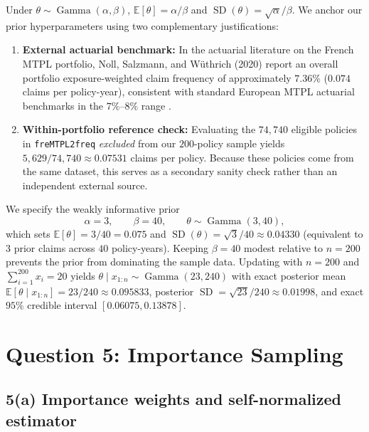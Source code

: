 \documentclass[11pt,a4paper]{article}
\begin{document}
Under $\theta \sim \operatorname{Gamma}(\alpha, \beta)$, $\mathbb{E}[\theta] = \alpha / \beta$ and $\operatorname{SD}(\theta) = \sqrt{\alpha} / \beta$. We anchor our prior hyperparameters using two complementary justifications:
\begin{enumerate}
    \item \textbf{External actuarial benchmark:} In the actuarial literature on the French MTPL portfolio, Noll, Salzmann, and W\"uthrich (2020) \cite{Noll2020} report an overall portfolio exposure-weighted claim frequency of approximately $7.36\%$ ($0.074$ claims per policy-year), consistent with standard European MTPL actuarial benchmarks in the $7\%$--$8\%$ range \cite{Charpentier2014}.
    \item \textbf{Within-portfolio reference check:} Evaluating the $74{,}740$ eligible policies in \texttt{freMTPL2freq} \emph{excluded} from our $200$-policy sample yields $5{,}629 / 74{,}740 \approx 0.07531$ claims per policy. Because these policies come from the same dataset, this serves as a secondary sanity check rather than an independent external source.
\end{enumerate}

We specify the weakly informative prior
\[
\boxed{\alpha = 3, \qquad \beta = 40, \qquad \theta \sim \operatorname{Gamma}(3, 40),}
\]
which sets $\mathbb{E}[\theta] = 3/40 = 0.075$ and $\operatorname{SD}(\theta) = \sqrt{3}/40 \approx 0.04330$ (equivalent to $3$ prior claims across $40$ policy-years). Keeping $\beta = 40$ modest relative to $n = 200$ prevents the prior from dominating the sample data. Updating with $n = 200$ and $\sum_{i=1}^{200} x_i = 20$ yields $\theta \mid x_{1:n} \sim \operatorname{Gamma}(23, 240)$ with exact posterior mean $\mathbb{E}[\theta \mid x_{1:n}] = 23/240 \approx 0.095833$, posterior $\operatorname{SD} = \sqrt{23}/240 \approx 0.01998$, and exact $95\%$ credible interval $[0.06075, 0.13878]$.

\section*{Question 5: Importance Sampling}

\subsection*{5(a) Importance weights and self-normalized estimator}
\end{document}
